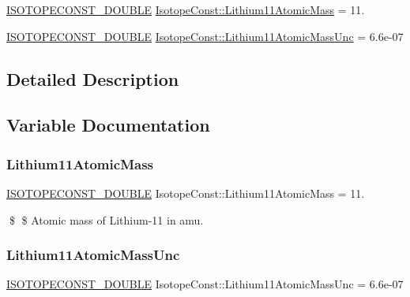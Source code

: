 \begin{DoxyCompactItemize}
\item 
\mbox{\hyperlink{group___isotope_const-_macros_ga8f45a7272ce02c0b4c65c44636ed719a}{I\+S\+O\+T\+O\+P\+E\+C\+O\+N\+S\+T\+\_\+\+D\+O\+U\+B\+LE}} \mbox{\hyperlink{group___isotope_const-_lithium-_li11_ga04609019a66c37b2a40c0002e5a97757}{Isotope\+Const\+::\+Lithium11\+Atomic\+Mass}} = 11.
\item 
\mbox{\hyperlink{group___isotope_const-_macros_ga8f45a7272ce02c0b4c65c44636ed719a}{I\+S\+O\+T\+O\+P\+E\+C\+O\+N\+S\+T\+\_\+\+D\+O\+U\+B\+LE}} \mbox{\hyperlink{group___isotope_const-_lithium-_li11_gae5aca8c20655391f8c81c856fc0e4a4e}{Isotope\+Const\+::\+Lithium11\+Atomic\+Mass\+Unc}} = 6.\+6e-\/07
\end{DoxyCompactItemize}


\subsection{Detailed Description}


\subsection{Variable Documentation}
\mbox{\label{group___isotope_const-_lithium-_li11_ga04609019a66c37b2a40c0002e5a97757}} 
\subsubsection{\texorpdfstring{Lithium11\+Atomic\+Mass}{Lithium11AtomicMass}}
{\footnotesize\ttfamily \mbox{\hyperlink{group___isotope_const-_macros_ga8f45a7272ce02c0b4c65c44636ed719a}{I\+S\+O\+T\+O\+P\+E\+C\+O\+N\+S\+T\+\_\+\+D\+O\+U\+B\+LE}} Isotope\+Const\+::\+Lithium11\+Atomic\+Mass = 11.}

\$ \$ Atomic mass of Lithium-\/11 in amu. \mbox{\label{group___isotope_const-_lithium-_li11_gae5aca8c20655391f8c81c856fc0e4a4e}} 
\subsubsection{\texorpdfstring{Lithium11\+Atomic\+Mass\+Unc}{Lithium11AtomicMassUnc}}
{\footnotesize\ttfamily \mbox{\hyperlink{group___isotope_const-_macros_ga8f45a7272ce02c0b4c65c44636ed719a}{I\+S\+O\+T\+O\+P\+E\+C\+O\+N\+S\+T\+\_\+\+D\+O\+U\+B\+LE}} Isotope\+Const\+::\+Lithium11\+Atomic\+Mass\+Unc = 6.\+6e-\/07}

